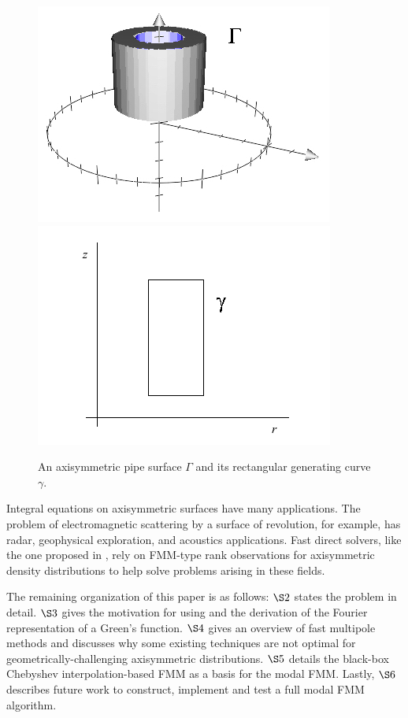 \documentclass[11pt, oneside]{article}   	%
\begin{document}
\begin{figure}[h]
\caption{An axisymmetric pipe surface $\Gamma$ and its rectangular generating curve $\gamma$.}
\label{fig:3}
\centering
\includegraphics[scale=0.5]{./images/pipe2}
\includegraphics[scale=0.5]{./images/rect}
\end{figure}

Integral equations on axisymmetric surfaces have many applications. The problem of electromagnetic scattering by a surface of revolution, for example, has radar, geophysical exploration, and acoustics applications. Fast direct solvers, like the one proposed in \cite{HMY}, rely on FMM-type rank observations for axisymmetric density distributions to help solve problems arising in these fields.

The remaining organization of this paper is as follows: $\S2$ states the problem in detail. $\S3$ gives the motivation for using and the derivation of the Fourier representation of a Green's function. $\S4$ gives an overview of fast multipole methods and discusses why some existing techniques are not optimal for geometrically-challenging axisymmetric distributions. $\S5$ details the black-box Chebyshev interpolation-based FMM as a basis for the modal FMM. Lastly, $\S6$ describes future work to construct, implement and test a full modal FMM algorithm.
\end{document}
